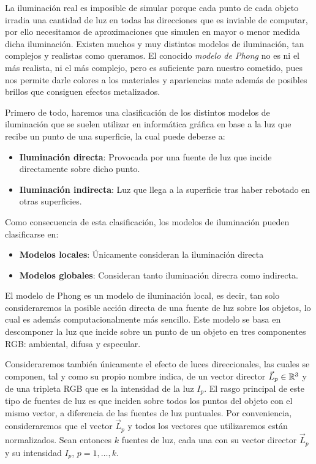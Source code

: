 La iluminación real es imposible de simular porque cada punto de cada objeto irradia una cantidad de luz en todas las direcciones que es inviable de computar, por ello necesitamos de aproximaciones que simulen en mayor o menor medida dicha iluminación. Existen muchos y muy distintos modelos de iluminación, tan complejos y realistas como queramos. El conocido \textit{modelo de Phong} no es ni el más realista, ni el más complejo, pero es suficiente para nuestro cometido, pues nos permite darle colores a los materiales y apariencias mate además de posibles brillos que consiguen efectos metalizados.

Primero de todo, haremos una clasificación de los distintos modelos de iluminación que se suelen utilizar en informática gráfica en base a la luz que recibe un punto de una superficie, la cual puede deberse a:
\begin{itemize}
    \item \textbf{Iluminación directa}: Provocada por una fuente de luz que incide directamente sobre dicho punto.
    \item \textbf{Iluminación indirecta}: Luz que llega a la superficie tras haber rebotado en otras superficies.
\end{itemize}
Como consecuencia de esta clasificación, los modelos de iluminación pueden clasificarse en:
\begin{itemize}
    \item \textbf{Modelos locales}: Únicamente consideran la iluminación directa
    \item \textbf{Modelos globales}: Consideran tanto iluminación direcra como indirecta.
\end{itemize}
El modelo de Phong es un modelo de iluminación local, es decir, tan solo consideraremos la posible acción directa de una fuente de luz sobre los objetos, lo cual es además computacionalmente más sencillo. Este modelo se basa en descomponer la luz que incide sobre un punto de un objeto en tres componentes RGB: ambiental, difusa y especular.

Consideraremos también únicamente el efecto de luces direccionales, las cuales se componen, tal y como su propio nombre indica, de un vector director $\vec L_p\in\mathbb{R}^3$ y de una tripleta RGB que es la intensidad de la luz $I_p$. El rasgo principal de este tipo de fuentes de luz es que inciden sobre todos los puntos del objeto con el mismo vector, a diferencia de las fuentes de luz puntuales. Por conveniencia, consideraremos que el vector $\vec L_p$ y todos los vectores que utilizaremos están normalizados. Sean entonces $k$ fuentes de luz, cada una con su vector director $\vec L_p$ y su intensidad $I_p$, $p=1,\dots,k$.


